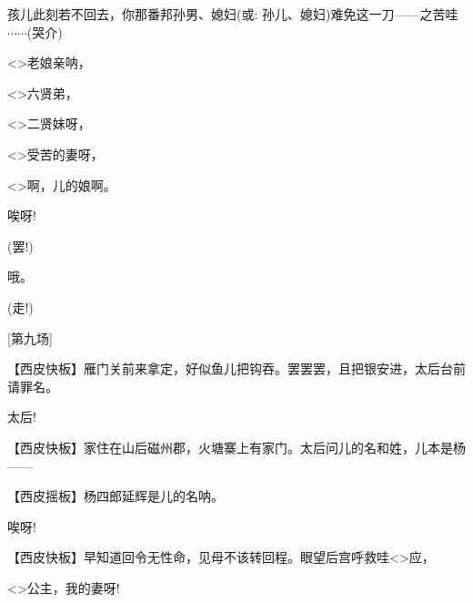{孩儿此刻若不回去，你那番邦孙男、媳妇({\akai 或}: 孙儿、媳妇)难免这一刀------之苦哇$\cdots{}\cdots{}$(哭介)

\textless{}\!\textgreater{}老娘亲呐，

\textless{}\!\textgreater{}六贤弟，

\textless{}\!\textgreater{}二贤妹呀，

\textless{}\!\textgreater{}受苦的妻呀，

\textless{}\!\textgreater{}啊，儿的娘啊。

唉呀!







(罢!)


哦。

(走!)

{{[}第九场{]}}

\setlength{\hangindent}{60pt} {【{\akai 西皮快板}】雁门关前来拿定，好似鱼儿把钩吞。罢罢罢，且把银安进，太后台前请罪名。}

{太后!}

\setlength{\hangindent}{60pt} {【{\akai 西皮快板}】家住在山后磁州郡，火塘寨上有家门。太后问儿的名和姓，儿本是杨------}

\setlength{\hangindent}{60pt} {【{\akai 西皮摇板}】杨四郎延辉是儿的名呐。}

{唉呀!}

\setlength{\hangindent}{60pt} {【{\akai 西皮快板}】早知道回令无性命，见母不该转回程。眼望后宫呼救哇}\textless{}\!\textgreater{}{应，}

\textless{}\!\textgreater{}{公主，我的妻呀!}

}
